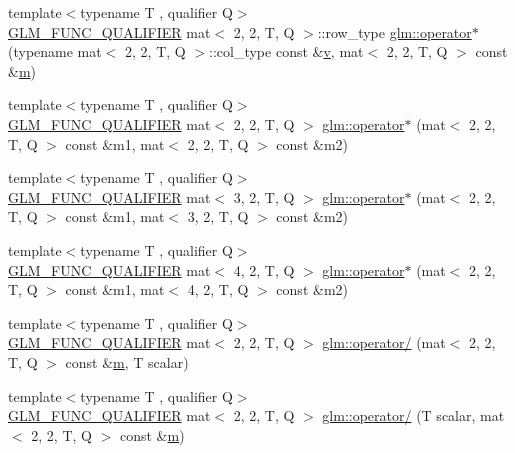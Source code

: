 \begin{DoxyCompactItemize}
\item 
{\footnotesize template$<$typename T , qualifier Q$>$ }\\\mbox{\hyperlink{setup_8hpp_a33fdea6f91c5f834105f7415e2a64407}{G\+L\+M\+\_\+\+F\+U\+N\+C\+\_\+\+Q\+U\+A\+L\+I\+F\+I\+ER}} mat$<$ 2, 2, T, Q $>$\+::row\+\_\+type \mbox{\hyperlink{namespaceglm_a71f3cfd138e28f76eb62c264a7ea1d27}{glm\+::operator$\ast$}} (typename mat$<$ 2, 2, T, Q $>$\+::col\+\_\+type const \&\mbox{\hyperlink{_s_d_l__opengl_8h_a10a82eabcb59d2fcd74acee063775f90}{v}}, mat$<$ 2, 2, T, Q $>$ const \&\mbox{\hyperlink{_s_d_l__opengl__glext_8h_af593500c283bf1a787a6f947f503a5c2}{m}})
\item 
{\footnotesize template$<$typename T , qualifier Q$>$ }\\\mbox{\hyperlink{setup_8hpp_a33fdea6f91c5f834105f7415e2a64407}{G\+L\+M\+\_\+\+F\+U\+N\+C\+\_\+\+Q\+U\+A\+L\+I\+F\+I\+ER}} mat$<$ 2, 2, T, Q $>$ \mbox{\hyperlink{namespaceglm_a9d351b42dc8b85017ba0859097a7c7cb}{glm\+::operator$\ast$}} (mat$<$ 2, 2, T, Q $>$ const \&m1, mat$<$ 2, 2, T, Q $>$ const \&m2)
\item 
{\footnotesize template$<$typename T , qualifier Q$>$ }\\\mbox{\hyperlink{setup_8hpp_a33fdea6f91c5f834105f7415e2a64407}{G\+L\+M\+\_\+\+F\+U\+N\+C\+\_\+\+Q\+U\+A\+L\+I\+F\+I\+ER}} mat$<$ 3, 2, T, Q $>$ \mbox{\hyperlink{namespaceglm_a32a3f3f150547afbd5920c527a0646cf}{glm\+::operator$\ast$}} (mat$<$ 2, 2, T, Q $>$ const \&m1, mat$<$ 3, 2, T, Q $>$ const \&m2)
\item 
{\footnotesize template$<$typename T , qualifier Q$>$ }\\\mbox{\hyperlink{setup_8hpp_a33fdea6f91c5f834105f7415e2a64407}{G\+L\+M\+\_\+\+F\+U\+N\+C\+\_\+\+Q\+U\+A\+L\+I\+F\+I\+ER}} mat$<$ 4, 2, T, Q $>$ \mbox{\hyperlink{namespaceglm_a40f4b250002244ef41c9b4b30090eeb0}{glm\+::operator$\ast$}} (mat$<$ 2, 2, T, Q $>$ const \&m1, mat$<$ 4, 2, T, Q $>$ const \&m2)
\item 
{\footnotesize template$<$typename T , qualifier Q$>$ }\\\mbox{\hyperlink{setup_8hpp_a33fdea6f91c5f834105f7415e2a64407}{G\+L\+M\+\_\+\+F\+U\+N\+C\+\_\+\+Q\+U\+A\+L\+I\+F\+I\+ER}} mat$<$ 2, 2, T, Q $>$ \mbox{\hyperlink{namespaceglm_a604ec21846ec7d5a3335c4858f91b1e8}{glm\+::operator/}} (mat$<$ 2, 2, T, Q $>$ const \&\mbox{\hyperlink{_s_d_l__opengl__glext_8h_af593500c283bf1a787a6f947f503a5c2}{m}}, T scalar)
\item 
{\footnotesize template$<$typename T , qualifier Q$>$ }\\\mbox{\hyperlink{setup_8hpp_a33fdea6f91c5f834105f7415e2a64407}{G\+L\+M\+\_\+\+F\+U\+N\+C\+\_\+\+Q\+U\+A\+L\+I\+F\+I\+ER}} mat$<$ 2, 2, T, Q $>$ \mbox{\hyperlink{namespaceglm_af94f7fcc9299aa7f2cbbcac8b4b251f5}{glm\+::operator/}} (T scalar, mat$<$ 2, 2, T, Q $>$ const \&\mbox{\hyperlink{_s_d_l__opengl__glext_8h_af593500c283bf1a787a6f947f503a5c2}{m}})

\end{DoxyCompactItemize}
